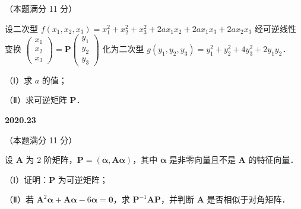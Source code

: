 \documentclass[UTF8,12pt,fontset=windows]{ctexart}
\begin{document}
（本题满分 11 分）

设二次型 $f(x_1, x_2, x_3) = x_1^2 + x_2^2 + x_3^2 + 2ax_1x_2 + 2ax_1x_3 + 2ax_2x_3$ 经可逆线性变换 $\begin{pmatrix} x_1 \\ x_2 \\ x_3 \end{pmatrix} = \boldsymbol{P}\begin{pmatrix} y_1 \\ y_2 \\ y_3 \end{pmatrix}$ 化为二次型 $g(y_1, y_2, y_3) = y_1^2 + y_2^2 + 4y_3^2 + 2y_1y_2$．

（Ⅰ）求 $a$ 的值；

（Ⅱ）求可逆矩阵 $\boldsymbol{P}$．

\vfill
\newpage
{\large\bfseries 2020.23}

（本题满分 11 分）

设 $\boldsymbol{A}$ 为 2 阶矩阵，$\boldsymbol{P} = (\boldsymbol{\alpha}, \boldsymbol{A}\boldsymbol{\alpha})$，其中 $\boldsymbol{\alpha}$ 是非零向量且不是 $\boldsymbol{A}$ 的特征向量．

（Ⅰ）证明：$\boldsymbol{P}$ 为可逆矩阵；

（Ⅱ）若 $\boldsymbol{A}^2\boldsymbol{\alpha} + \boldsymbol{A}\boldsymbol{\alpha} - 6\boldsymbol{\alpha} = \boldsymbol{0}$，求 $\boldsymbol{P}^{-1}\boldsymbol{A}\boldsymbol{P}$，并判断 $\boldsymbol{A}$ 是否相似于对角矩阵．

\vfill
\end{document}
